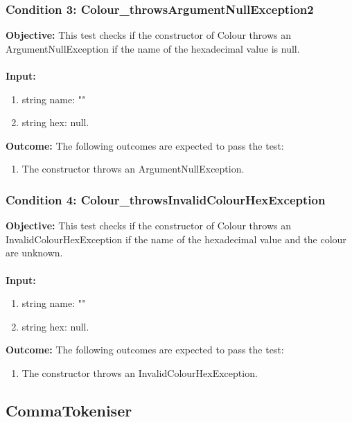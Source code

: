 \documentclass[a4paper,12pt]{article}
\begin{document}
		\subsubsection{Condition 3: Colour\_throwsArgumentNullException2}
			\textbf{Objective:} This test checks if the constructor of Colour throws an ArgumentNullException if the name of the hexadecimal value is null.\\\\
			\textbf{Input:}
				\begin{enumerate}
					\item string name: ""
					\item string hex: null.
				\end{enumerate}
			\textbf{Outcome:} The following outcomes are expected to pass the test:
				\begin{enumerate}
					\item The constructor throws an ArgumentNullException.
				\end{enumerate}
		\subsubsection{Condition 4: Colour\_throwsInvalidColourHexException}
			\textbf{Objective:} This test checks if the constructor of Colour throws an InvalidColourHexException if the name of the hexadecimal value and the colour are unknown.\\\\
			\textbf{Input:} 
				\begin{enumerate}
					\item string name: ""
					\item string hex: null.
				\end{enumerate}
			\textbf{Outcome:} The following outcomes are expected to pass the test:
				\begin{enumerate}
					\item The constructor throws an InvalidColourHexException.
				\end{enumerate}
	\subsection{CommaTokeniser}
\end{document}

